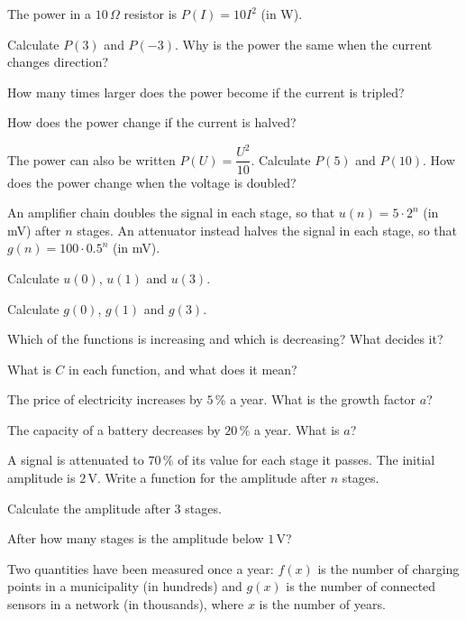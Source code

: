 The power in a $10\,\Omega$ resistor is $P(I) = 10I^2$ (in W).
\begin{parts}
  \item Calculate $P(3)$ and $P(-3)$. Why is the power the same when the current changes direction?
  \item How many times larger does the power become if the current is tripled?
  \item How does the power change if the current is halved?
  \item The power can also be written $P(U) = \dfrac{U^2}{10}$. Calculate $P(5)$ and $P(10)$. How does
    the power change when the voltage is doubled?
\end{parts}

An amplifier chain doubles the signal in each stage, so that $u(n) = 5 \cdot 2^n$ (in mV) after
$n$ stages. An attenuator instead halves the signal in each stage, so that $g(n) = 100 \cdot
0.5^n$ (in mV).
\begin{parts}
  \item Calculate $u(0)$, $u(1)$ and $u(3)$.
  \item Calculate $g(0)$, $g(1)$ and $g(3)$.
  \item Which of the functions is increasing and which is decreasing? What decides it?
  \item What is $C$ in each function, and what does it mean?
\end{parts}

\begin{parts}
  \item The price of electricity increases by $5\,\%$ a year. What is the growth factor $a$?
  \item The capacity of a battery decreases by $20\,\%$ a year. What is $a$?
  \item A signal is attenuated to $70\,\%$ of its value for each stage it passes. The initial
    amplitude is $2\,\text{V}$. Write a function for the amplitude after $n$ stages.
  \item Calculate the amplitude after $3$ stages.
  \item After how many stages is the amplitude below $1\,\text{V}$?
\end{parts}

Two quantities have been measured once a year: $f(x)$ is the number of charging points in a
municipality (in hundreds) and $g(x)$ is the number of connected sensors in a network (in
thousands), where $x$ is the number of years.

